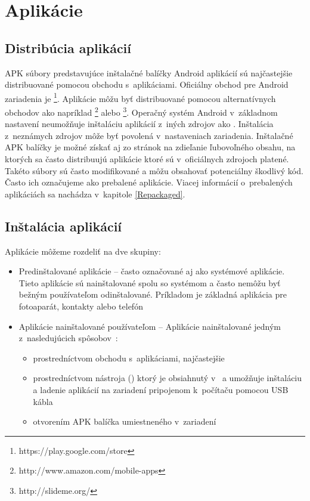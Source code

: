 \section{Aplikácie}
\subsection{Distribúcia aplikácií}

APK súbory predstavujúce inštalačné balíčky Android aplikácií sú najčastejšie distribuované pomocou obchodu s~aplikáciami. Oficiálny obchod pre Android zariadenia je \footnote{https://play.google.com/store}. Aplikácie môžu byť distribuované pomocou alternatívnych obchodov ako napríklad \footnote{http://www.amazon.com/mobile-apps} alebo \footnote{http://slideme.org/}. Operačný systém Android v~základnom nastavení neumožňuje inštaláciu aplikácií z~iných zdrojov ako . Inštalácia z~neznámych zdrojov môže byť povolená v~nastaveniach zariadenia. Inštalačné APK balíčky je možné získať aj zo stránok na zdieľanie ľubovoľného obsahu, na ktorých sa často distribuujú aplikácie ktoré sú v~oficiálnych zdrojoch platené. Takéto súbory sú často modifikované a môžu obsahovať potenciálny škodlivý kód. Často ich označujeme ako prebalené aplikácie. Viacej informácií o~prebalených aplikáciách sa nachádza v~kapitole \ref{Repackaged}.

\subsection{Inštalácia aplikácií}
Aplikácie môžeme rozdeliť na dve skupiny:
\begin{itemize}
\item Predinštalované aplikácie – často označované aj ako systémové aplikácie. Tieto aplikácie sú nainštalované spolu so systémom a často nemôžu byť bežným používateľom odinštalované. Príkladom je základná aplikácia pre fotoaparát, kontakty alebo telefón
\item Aplikácie nainštalované používateľom – Aplikácie nainštalované jedným z~nasledujúcich spôsobov~\cite{Elenkov2015}:
\begin{itemize}
\item prostredníctvom obchodu s~aplikáciami, najčastejšie 
\item prostredníctvom nástroja  () ktorý je obsiahnutý v~ a umožňuje inštaláciu a ladenie aplikácií na zariadení pripojenom k~počítaču pomocou USB kábla
\item otvorením APK balíčka umiestneného v~zariadení
\end{itemize}
\end{itemize}

